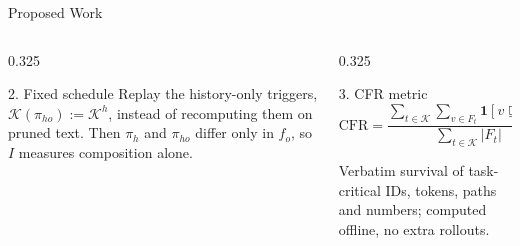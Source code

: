\documentclass[aspectratio=169,10pt]{beamer}
\begin{document}
\begin{frame}{Proposed Work}
\begin{columns}[T]
\begin{column}{0.325\textwidth}
\begin{block}{2. Fixed schedule}
\scriptsize
Replay the history-only triggers, $\mathcal{K}(\pi_{ho}):=\mathcal{K}^{h}$,
instead of recomputing them on pruned text. Then $\pi_h$ and $\pi_{ho}$ differ
only in $f_o$, so $I$ measures composition alone.
\end{block}
\end{column}
\begin{column}{0.325\textwidth}
\begin{block}{3. CFR metric}
\scriptsize
\vspace{-0.2cm}
\[
\mathrm{CFR}=\frac{\sum_{t\in\mathcal{K}}\sum_{v\in F_t}\mathbf{1}[v\sqsubseteq h'_t]}
{\sum_{t\in\mathcal{K}}|F_t|}
\]
\vspace{-0.25cm}

Verbatim survival of task-critical IDs, tokens, paths and numbers; computed
offline, no extra rollouts.
\end{block}
\end{column}
\end{columns}
\end{frame}

\end{document}

